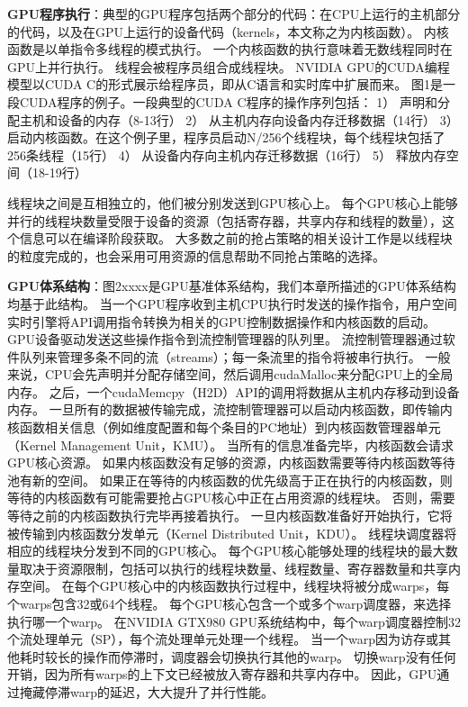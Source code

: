 \textbf{GPU程序执行}：典型的GPU程序包括两个部分的代码：在CPU上运行的主机部分的代码，以及在GPU上运行的设备代码（kernels，本文称之为内核函数）。
内核函数是以单指令多线程的模式执行。
一个内核函数的执行意味着无数线程同时在GPU上并行执行。
线程会被程序员组合成线程块。
NVIDIA GPU的CUDA编程模型以CUDA C的形式展示给程序员，即从C语言和实时库中扩展而来。
图1是一段CUDA程序的例子。一段典型的CUDA C程序的操作序列包括：
1）	声明和分配主机和设备的内存（8-13行）
2）	从主机内存向设备内存迁移数据（14行）
3）	启动内核函数。在这个例子里，程序员启动N/256个线程块，每个线程块包括了256条线程（15行）
4）	从设备内存向主机内存迁移数据（16行）
5）	释放内存空间（18-19行）

线程块之间是互相独立的，他们被分别发送到GPU核心上。
每个GPU核心上能够并行的线程块数量受限于设备的资源（包括寄存器，共享内存和线程的数量），这个信息可以在编译阶段获取。
大多数之前的抢占策略的相关设计工作是以线程块的粒度完成的，也会采用可用资源的信息帮助不同抢占策略的选择。

\textbf{GPU体系结构}：图2xxxx是GPU基准体系结构，我们本章所描述的GPU体系结构均基于此结构。
当一个GPU程序收到主机CPU执行时发送的操作指令，用户空间实时引擎将API调用指令转换为相关的GPU控制数据操作和内核函数的启动。
GPU设备驱动发送这些操作指令到流控制管理器的队列里。
流控制管理器通过软件队列来管理多条不同的流（streams）；每一条流里的指令将被串行执行。
一般来说，CPU会先声明并分配存储空间，然后调用cudaMalloc来分配GPU上的全局内存。
之后，一个cudaMemcpy（H2D）API的调用将数据从主机内存移动到设备内存。
一旦所有的数据被传输完成，流控制管理器可以启动内核函数，即传输内核函数相关信息（例如维度配置和每个条目的PC地址）到内核函数管理器单元（Kernel Management Unit，KMU）。
当所有的信息准备完毕，内核函数会请求GPU核心资源。
如果内核函数没有足够的资源，内核函数需要等待内核函数等待池有新的空间。
如果正在等待的内核函数的优先级高于正在执行的内核函数，则等待的内核函数有可能需要抢占GPU核心中正在占用资源的线程块。
否则，需要等待之前的内核函数执行完毕再接着执行。
一旦内核函数准备好开始执行，它将被传输到内核函数分发单元（Kernel Distributed Unit，KDU）。
线程块调度器将相应的线程块分发到不同的GPU核心。
每个GPU核心能够处理的线程块的最大数量取决于资源限制，包括可以执行的线程块数量、线程数量、寄存器数量和共享内存空间。
在每个GPU核心中的内核函数执行过程中，线程块将被分成warps，每个warps包含32或64个线程。
每个GPU核心包含一个或多个warp调度器，来选择执行哪一个warp。
在NVIDIA GTX980 GPU系统结构中，每个warp调度器控制32个流处理单元（SP），每个流处理单元处理一个线程。
当一个warp因为访存或其他耗时较长的操作而停滞时，调度器会切换执行其他的warp。
切换warp没有任何开销，因为所有warps的上下文已经被放入寄存器和共享内存中。
因此，GPU通过掩藏停滞warp的延迟，大大提升了并行性能。

